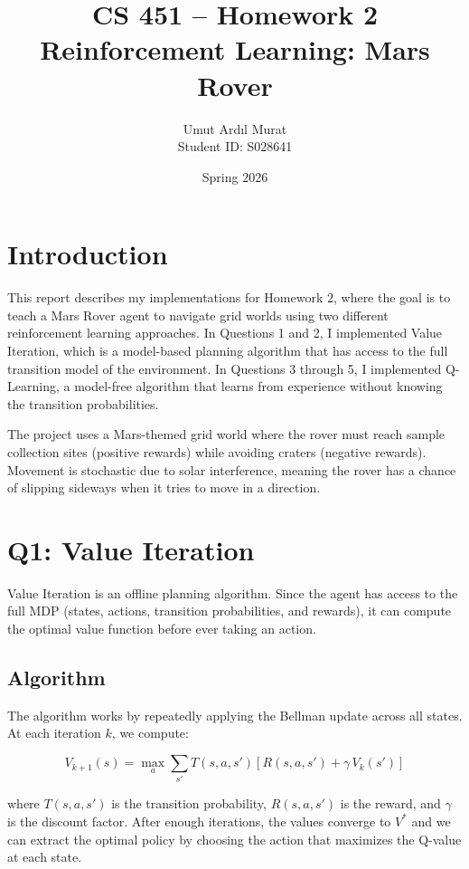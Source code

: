 \documentclass[11pt,a4paper]{article}
\title{CS 451 -- Homework 2 \\ Reinforcement Learning: Mars Rover}
\author{Umut Ardıl Murat \\ Student ID: S028641}
\date{Spring 2026}
\begin{document}
\maketitle

\section{Introduction}

This report describes my implementations for Homework 2, where the goal is to teach a Mars Rover agent to navigate grid worlds using two different reinforcement learning approaches. In Questions 1 and 2, I implemented Value Iteration, which is a model-based planning algorithm that has access to the full transition model of the environment. In Questions 3 through 5, I implemented Q-Learning, a model-free algorithm that learns from experience without knowing the transition probabilities.

The project uses a Mars-themed grid world where the rover must reach sample collection sites (positive rewards) while avoiding craters (negative rewards). Movement is stochastic due to solar interference, meaning the rover has a chance of slipping sideways when it tries to move in a direction.

\section{Q1: Value Iteration}

Value Iteration is an offline planning algorithm. Since the agent has access to the full MDP (states, actions, transition probabilities, and rewards), it can compute the optimal value function before ever taking an action.

\subsection{Algorithm}

The algorithm works by repeatedly applying the Bellman update across all states. At each iteration $k$, we compute:

\[
V_{k+1}(s) = \max_{a} \sum_{s'} T(s, a, s') \left[ R(s, a, s') + \gamma \, V_k(s') \right]
\]

where $T(s,a,s')$ is the transition probability, $R(s,a,s')$ is the reward, and $\gamma$ is the discount factor. After enough iterations, the values converge to $V^*$ and we can extract the optimal policy by choosing the action that maximizes the Q-value at each state.
\end{document}
